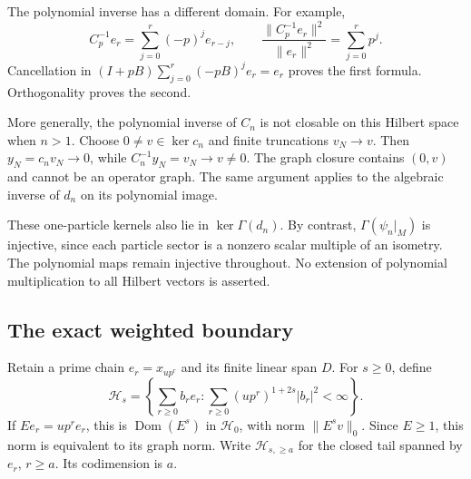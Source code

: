 The polynomial inverse has a different domain.
For example,
\[
 C_p^{-1}e_r=\sum_{j=0}^r(-p)^je_{r-j},\qquad
 \frac{\|C_p^{-1}e_r\|^2}{\|e_r\|^2}=\sum_{j=0}^rp^j.
\]
Cancellation in $(I+pB)\sum_{j=0}^r(-pB)^je_r=e_r$
proves the first formula. Orthogonality proves the second.

More generally, the polynomial inverse of $C_n$ is not closable
on this Hilbert space when $n>1$.
Choose $0\ne v\in\ker c_n$ and finite truncations $v_N\to v$.
Then $y_N=c_nv_N\to0$, while $C_n^{-1}y_N=v_N\to v\ne0$.
The graph closure contains $(0,v)$ and cannot be an operator graph.
The same argument applies to the algebraic inverse of $d_n$
on its polynomial image.

These one-particle kernels also lie in $\ker\Gamma(d_n)$.
By contrast, $\Gamma(\psi_n|_M)$ is injective, since each
particle sector is a nonzero scalar multiple of an isometry.
The polynomial maps remain injective throughout.
No extension of polynomial multiplication to all Hilbert vectors is asserted.

\subsection{The exact weighted boundary}

Retain a prime chain $e_r=x_{up^r}$ and its finite linear span $D$.
For $s\geq0$, define
\begin{equation}
 \label{v4-arith:hecke:eq:weighted}
 \mathcal H_s=\left\{\sum_{r\geq0}b_re_r:
   \sum_{r\geq0}(up^r)^{1+2s}|b_r|^2<\infty\right\}.
\end{equation}
If $Ee_r=up^re_r$, this is $\operatorname{Dom}(E^s)$ in $\mathcal H_0$,
with norm $\|E^sv\|_0$.
Since $E\geq1$, this norm is equivalent to its graph norm.
Write $\mathcal H_{s,\geq a}$ for the closed tail spanned by $e_r$, $r\geq a$.
Its codimension is $a$.


